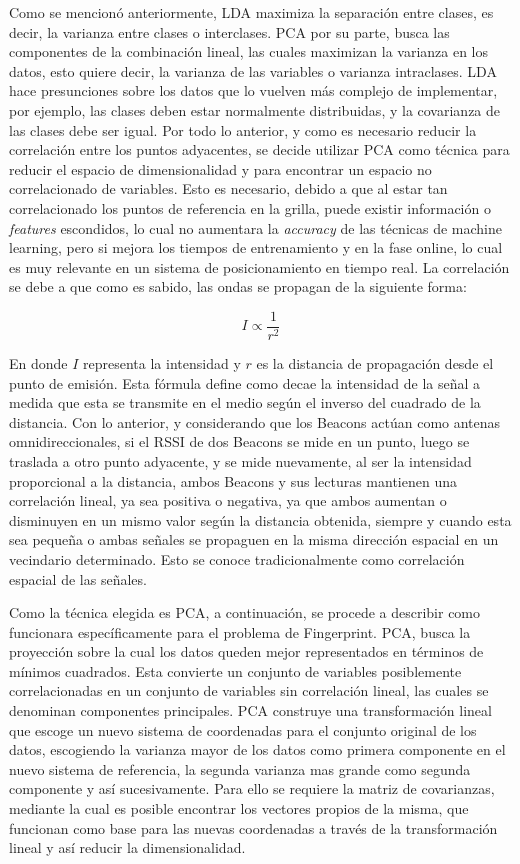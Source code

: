 Como se mencionó anteriormente, LDA maximiza la separación entre clases, es decir, la varianza entre clases o interclases. PCA por su parte, busca las componentes de la combinación lineal, las cuales maximizan la varianza en los datos, esto quiere decir, la varianza de las variables o varianza intraclases. LDA hace presunciones sobre los datos que lo vuelven más complejo de implementar, por ejemplo, las clases deben estar normalmente distribuidas, y la covarianza de las clases debe ser igual. Por todo lo anterior, y como es necesario reducir la correlación entre los puntos adyacentes, se decide utilizar PCA como técnica para reducir el espacio de dimensionalidad y para encontrar un espacio no correlacionado de variables. Esto es necesario, debido a que al estar tan correlacionado los puntos de referencia en la grilla, puede existir información o \textit{features} escondidos, lo cual no aumentara la \textit{accuracy} de las técnicas de machine learning, pero si mejora los tiempos de entrenamiento y en la fase online, lo cual es muy relevante en un sistema de posicionamiento en tiempo real. La correlación se debe a que como es sabido, las ondas se propagan de la siguiente forma:

\begin{equation} 
I \propto \frac{1}{r^{2}}
\end{equation}

En donde $I$ representa la intensidad y $r$ es la distancia de propagación desde el punto de emisión. Esta fórmula define como decae la intensidad de la señal a medida que esta se transmite en el medio según el inverso del cuadrado de la distancia. Con lo anterior, y considerando que los Beacons actúan como antenas omnidireccionales, si el RSSI de dos Beacons se mide en un punto, luego se traslada a otro punto adyacente, y se mide nuevamente,  al ser la intensidad proporcional a la distancia, ambos Beacons y sus lecturas mantienen una correlación lineal, ya sea positiva o negativa, ya que ambos aumentan o disminuyen en un mismo valor según la distancia obtenida, siempre y cuando esta sea pequeña o ambas señales se propaguen en la misma dirección espacial en un vecindario determinado. Esto se conoce tradicionalmente como correlación espacial de las señales.

Como la técnica elegida es PCA, a continuación, se procede a describir como funcionara específicamente para el problema de Fingerprint. PCA, busca la proyección sobre la cual los datos queden mejor representados en términos de mínimos cuadrados. Esta convierte un conjunto de variables posiblemente correlacionadas en un conjunto de variables sin correlación lineal, las cuales se denominan componentes principales. PCA construye una transformación lineal que escoge un nuevo sistema de coordenadas para el conjunto original de los datos, escogiendo la varianza mayor de los datos como primera componente en el nuevo sistema de referencia, la segunda varianza mas grande como segunda componente y así sucesivamente. Para ello se requiere la matriz de covarianzas, mediante la cual es posible encontrar los vectores propios de la misma, que funcionan como base para las nuevas coordenadas a través de la transformación lineal y así reducir la dimensionalidad.

